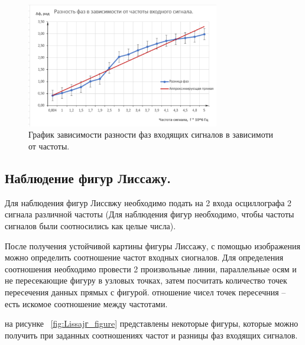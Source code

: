 \documentclass[12pt,a4paper]{article}
\begin{document}
	\begin{figure}
		\begin{center}
			\includegraphics[width = 0.75\textwidth]{Grafic_delta_phases}
			\caption{График зависимости разности фаз входящих сигналов в зависимоти от частоты.}
			\label{fig:grafic_delta_phases}
		\end{center}
	\end{figure}
	
	
	\newpage
	
	\subsection{Наблюдение фигур Лиссажу.}

	Для наблюдения фигур Лиссвжу необходимо подать на 2 входа осциллографа 2 сигнала различной частоты (Для наблюдения фигур необходимо, чтобы частоты сигналов были соотносились как целые числа).
	
	После получения устойчивой картины фигуры Лиссажу, с помощью изображения можно определить соотношение частот входных сиогналов. Для определения соотношения необходимо провести 2 произвольные линии, параллельные осям и не пересекающие фигуру в узловых точках, затем посчитать количество точек пересечения данных прямых с фигурой. отношение чисел точек пересечния -- есть искомое соотношение между частотами.
	
	на рисунке ~\ref{fig:Lissajг_figure} представлены некоторые фигуры, которые можно получить при заданных соотношениях частот и разницы фаз входящих сигналов.
	
\end{document}
